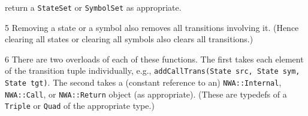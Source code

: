 \begin{sidewaystable}
\begin{threeparttable}
\begin{tablenotes}
    return a \texttt{StateSet} or \texttt{SymbolSet} as appropriate.
  \item[5] Removing a state or a symbol also removes all transitions
    involving it. (Hence clearing all states or clearing all symbols also
    clears all transitions.)
  \item[6] There are two overloads of each of these functions. The first
    takes each element of the transition tuple individually,
    e.g., \texttt{addCallTrans(State src, State sym, State tgt)}. The
    second takes a (constant reference to an) \texttt{NWA::Internal},
    \texttt{NWA::Call}, or \texttt{NWA::Return} object (as
    appropriate). (These are typedefs of a \texttt{Triple} or \texttt{Quad}
    of the appropriate type.)
\end{tablenotes}
\end{threeparttable}
\end{sidewaystable}
\restoregeometry



\newcommand{\RP}{\tnote{1}} %

\setlength{\extrarowheight}{4pt}

